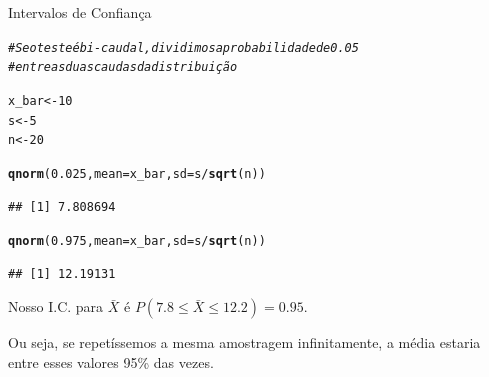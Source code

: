 \documentclass{beamer}\usepackage[]{graphicx}\usepackage[]{color}
\makeatletter
\newcommand{\hlnum}[1]{\textcolor[rgb]{0.686,0.059,0.569}{#1}}%
\newcommand{\hlcom}[1]{\textcolor[rgb]{0.678,0.584,0.686}{\textit{#1}}}%
\newcommand{\hlopt}[1]{\textcolor[rgb]{0,0,0}{#1}}%
\newcommand{\hlstd}[1]{\textcolor[rgb]{0.345,0.345,0.345}{#1}}%
\newcommand{\hlkwb}[1]{\textcolor[rgb]{0.69,0.353,0.396}{#1}}%
\newcommand{\hlkwc}[1]{\textcolor[rgb]{0.333,0.667,0.333}{#1}}%
\newcommand{\hlkwd}[1]{\textcolor[rgb]{0.737,0.353,0.396}{\textbf{#1}}}%
\newenvironment{kframe}{%
 \def\at@end@of@kframe{}%
 \ifinner\ifhmode%
  \def\at@end@of@kframe{\end{minipage}}%
  \begin{minipage}{\columnwidth}%
 \fi\fi%
 \def\FrameCommand##1{\hskip\@totalleftmargin \hskip-\fboxsep
 \colorbox{shadecolor}{##1}\hskip-\fboxsep
     \hskip-\linewidth \hskip-\@totalleftmargin \hskip\columnwidth}%
 \MakeFramed {\advance\hsize-\width
   \@totalleftmargin\z@ \linewidth\hsize
   \@setminipage}}%
 {\par\unskip\endMakeFramed%
 \at@end@of@kframe}
\newenvironment{knitrout}{}{} %
\renewenvironment{knitrout}{\setlength{\topsep}{0mm}}{}
\makeatother
\begin{document}
\begin{frame}[fragile]{Intervalos de Confiança}

\begin{knitrout}\tiny
{}\color{fgcolor}\begin{kframe}
\begin{alltt}
\hlcom{# Se o teste é bi-caudal, dividimos a probabilidade de 0.05}
\hlcom{# entre as duas caudas da distribuição}

\hlstd{x_bar} \hlkwb{<-} \hlnum{10}
\hlstd{s} \hlkwb{<-} \hlnum{5}
\hlstd{n} \hlkwb{<-} \hlnum{20}

\hlkwd{qnorm}\hlstd{(}\hlnum{0.025}\hlstd{,}\hlkwc{mean}\hlstd{=x_bar,}\hlkwc{sd}\hlstd{=s}\hlopt{/}\hlkwd{sqrt}\hlstd{(n))}
\end{alltt}
\begin{verbatim}
## [1] 7.808694
\end{verbatim}
\begin{alltt}
\hlkwd{qnorm}\hlstd{(}\hlnum{0.975}\hlstd{,}\hlkwc{mean}\hlstd{=x_bar,}\hlkwc{sd}\hlstd{=s}\hlopt{/}\hlkwd{sqrt}\hlstd{(n))}
\end{alltt}
\begin{verbatim}
## [1] 12.19131
\end{verbatim}
\end{kframe}
\end{knitrout}

\begin{small}


Nosso I.C. para $\bar{X}$ é $P(7.8 \leq \bar{X} \leq 12.2) = 0.95$.

Ou seja, se repetíssemos a mesma amostragem infinitamente, a média estaria entre esses valores 95\% das vezes. 

\end{small}

\end{frame}
\end{document}
